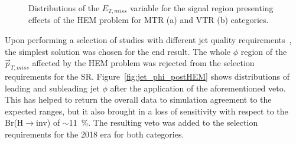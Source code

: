 \begin{figure}[htbp]
  \centering
  \caption{Distributions of the $E_{T,miss}$ variable for the signal region presenting effects of the HEM problem for MTR (a) and VTR (b) categories.  }
  \label{fig:hem_met}
\end{figure}



\hspace{10pt} Upon performing a selection of studies with different jet quality requirements~\cite{note:AN_19_257}, the simplest solution was chosen for the end result. The whole $\phi$ region of the $\vec{p}_{T, miss}$ affected by the HEM problem was rejected from the selection requirements for the SR. Figure~\ref{fig:jet_phi_postHEM} shows distributions of leading and subleading jet $\phi$ after the application of the aforementioned veto. This has helped to return the overall data to simulation agreement to the expected ranges, but it also brought in a loss of sensitivity with respect to the Br(H$\rightarrow$inv) of $\sim$11~\%. The resulting veto was added to the selection requirements for the 2018 era for both categories.

